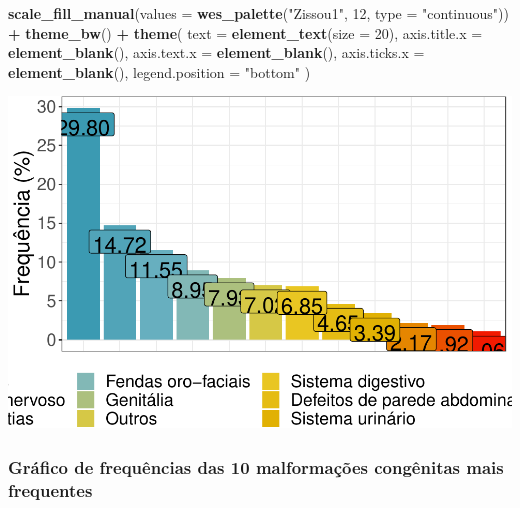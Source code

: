 \documentclass[
]{article}
\newenvironment{Shaded}{\begin{snugshade}}{\end{snugshade}}
\newcommand{\AttributeTok}[1]{\textcolor[rgb]{0.13,0.29,0.53}{#1}}
\newcommand{\DecValTok}[1]{\textcolor[rgb]{0.00,0.00,0.81}{#1}}
\newcommand{\FunctionTok}[1]{\textcolor[rgb]{0.13,0.29,0.53}{\textbf{#1}}}
\newcommand{\NormalTok}[1]{#1}
\newcommand{\SpecialCharTok}[1]{\textcolor[rgb]{0.81,0.36,0.00}{\textbf{#1}}}
\newcommand{\StringTok}[1]{\textcolor[rgb]{0.31,0.60,0.02}{#1}}
\begin{document}
\begin{Shaded}
\begin{Highlighting}[]
    \FunctionTok{scale\_fill\_manual}\NormalTok{(}\AttributeTok{values =} \FunctionTok{wes\_palette}\NormalTok{(}\StringTok{"Zissou1"}\NormalTok{, }\DecValTok{12}\NormalTok{, }\AttributeTok{type =} \StringTok{"continuous"}\NormalTok{)) }\SpecialCharTok{+}
    \FunctionTok{theme\_bw}\NormalTok{() }\SpecialCharTok{+}
    \FunctionTok{theme}\NormalTok{(}
      \AttributeTok{text =} \FunctionTok{element\_text}\NormalTok{(}\AttributeTok{size =} \DecValTok{20}\NormalTok{),}
      \AttributeTok{axis.title.x =} \FunctionTok{element\_blank}\NormalTok{(),}
      \AttributeTok{axis.text.x =} \FunctionTok{element\_blank}\NormalTok{(),}
      \AttributeTok{axis.ticks.x =} \FunctionTok{element\_blank}\NormalTok{(),}
      \AttributeTok{legend.position =} \StringTok{"bottom"}
\NormalTok{    )}
\end{Highlighting}
\end{Shaded}

\includegraphics{anom_files/figure-latex/unnamed-chunk-35-1.pdf}

\hypertarget{gruxe1fico-de-frequuxeancias-das-10-malformauxe7uxf5es-conguxeanitas-mais-frequentes}{%
\subsubsection{Gráfico de frequências das 10 malformações congênitas
mais
frequentes}\label{gruxe1fico-de-frequuxeancias-das-10-malformauxe7uxf5es-conguxeanitas-mais-frequentes}}
\end{document}
